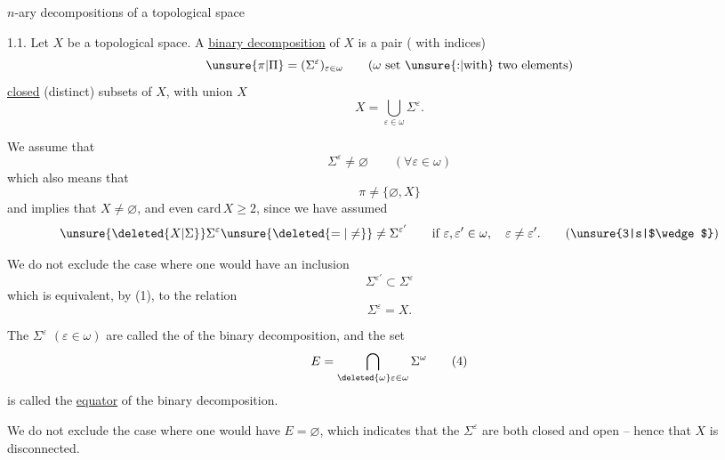 \begingroup
\makeatletter\tagsleft@true\makeatother

\noindent $n$-ary decompositions of a topological space

1.1. Let $X$ be a topological space. A \uline{binary decomposition} of $X$ is a pair ( with indices)
\[
\unsure{\pi|\Pi}=(\Sigma^\varepsilon)_{\varepsilon\in\omega}\qquad(\omega\ \text{set \unsure{:|with} two elements})
\]
  \uline{closed} (distinct) subsets of $X$, with union $X$
\[
X=\bigcup_{\varepsilon\in\omega}\Sigma^\varepsilon.\tag*{(1)}
\]

We assume that
\[
\Sigma^\varepsilon\ne\varnothing\qquad(\forall\varepsilon\in\omega)\tag*{(2)}
\]
which also means that
\[
\pi\ne\{\varnothing,X\}\tag*{$(2')$}
\]
and implies that $X\ne\varnothing$, and even $\mathrm{card}\,X\geq 2$, since we have assumed
\[
\unsure{\deleted{X|\Sigma}}\Sigma^\varepsilon\unsure{\deleted{=|\ne}}\ne\Sigma^{\varepsilon'}\qquad\text{if }\varepsilon,\varepsilon'\in\omega,\quad\varepsilon\ne\varepsilon'.\tag*{(\unsure{3|s|$\wedge$})}
\]

We do not exclude the case where one would have an inclusion
\[
\Sigma^{\varepsilon'}\subset\Sigma^\varepsilon
\]
which is equivalent, by (1), to the relation
\[
\Sigma^\varepsilon=X.
\]

The $\Sigma^\varepsilon$ $(\varepsilon\in\omega)$ are called the \uline{} of the binary decomposition,  and the set
\[
E=\bigcap_{\deleted{\omega}\varepsilon\in\omega}\Sigma^\omega\tag*{(4)}
\]
is called the \uline{equator} of the binary decomposition.

We do not exclude the case where one would have $E=\varnothing$, which indicates that the $\Sigma^\varepsilon$ \inserted{$(\varepsilon\in\omega)$} are  both closed and open -- hence that $X$ is disconnected.
\endgroup

